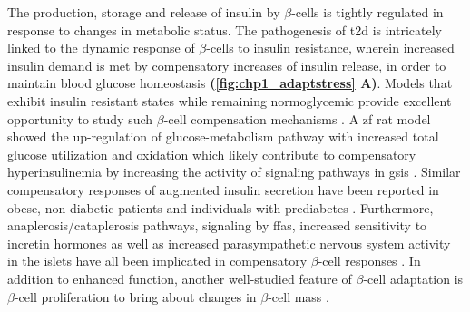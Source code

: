 \par The production, storage and release of insulin by $\beta$-cells is tightly regulated in response to changes in metabolic status. The pathogenesis of \gls{t2d} is intricately linked to the dynamic response of $\beta$-cells to insulin resistance, wherein increased insulin demand is met by compensatory increases of insulin release, in order to maintain blood glucose homeostasis \textbf{(\autoref{fig:chp1_adaptstress} A)}. Models that exhibit insulin resistant states while remaining normoglycemic provide excellent opportunity to study such $\beta$-cell compensation mechanisms \textbf{\cite{prentki_islet_2006, liu_beta-cell_2002}}. A \gls{zf} rat model showed the up-regulation of glucose-metabolism pathway with increased total glucose utilization and oxidation which likely contribute to compensatory hyperinsulinemia by increasing the activity of signaling pathways in \gls{gsis} \textbf{\cite{liu_beta-cell_2002}}. Similar compensatory responses of augmented insulin secretion have been reported in obese, non-diabetic patients and individuals with prediabetes \textbf{\cite{hudish__2019,chandrashekar_25-hydroxy_2015,polonsky_twenty-four-hour_1988}}. Furthermore, anaplerosis/cataplerosis pathways, signaling by \glspl{ffa}, increased sensitivity to incretin hormones as well as increased parasympathetic nervous system activity in the islets have all been implicated in compensatory $\beta$-cell responses \textbf{\cite{prentki_islet_2006}}. In addition to enhanced function, another well-studied feature of $\beta$-cell adaptation is $\beta$-cell proliferation to bring about changes in $\beta$-cell mass \textbf{\cite{hudish__2019}}.\\

